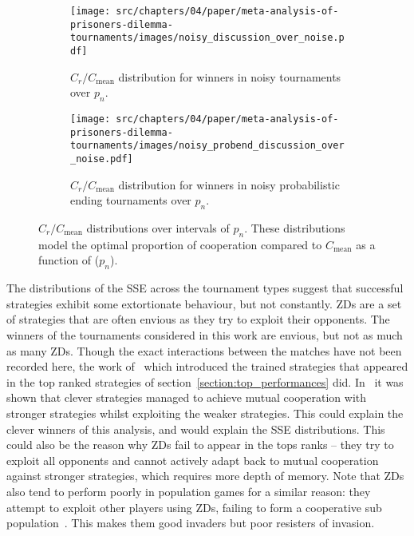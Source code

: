 \begin{figure}[!htbp]
    \centering
    \begin{subfigure}{0.485\textwidth}
        \centering
        \texttt{[image: src/chapters/04/paper/meta-analysis-of-prisoners-dilemma-tournaments/images/noisy\_discussion\_over\_noise.pdf]}
        \caption{\(C_r / C_{\text{mean}}\) distribution for winners in noisy tournaments over
        \(p_n\).}\label{fig:noisy_discussion_over_noise}
    \end{subfigure}
    \hfill
    \begin{subfigure}{0.485\textwidth}
        \centering
        \texttt{[image: src/chapters/04/paper/meta-analysis-of-prisoners-dilemma-tournaments/images/noisy\_probend\_discussion\_over\_noise.pdf]}
        \caption{\(C_r / C_{\text{mean}}\) distribution for winners in noisy probabilistic ending tournaments over
        \(p_n\).}\label{fig:noisy_probend_discussion_over_noise}
    \end{subfigure}
    \caption{\(C_r / C_{\text{mean}}\) distributions over intervals of \(p_n\).
    These distributions model the optimal proportion of cooperation
    compared to \(C_{\text{mean}}\) as a function of (\(p_n\)).}
    \label{fig:compared_to_mean_over_noise_probability}
\end{figure}

The distributions of the SSE across the tournament types suggest that successful
strategies exhibit some extortionate behaviour, but not constantly.
ZDs are a set of strategies that are often envious as they try to exploit their
opponents. The winners of the tournaments considered in this work are
envious, but not as much as many ZDs.
Though the exact interactions between the matches have not been recorded here,
the work of~\cite{Harper2017} which introduced the trained strategies that
appeared in the top ranked strategies of section~\ref{section:top_performances}
did. In~\cite{Harper2017} it was shown that clever strategies managed to achieve
mutual cooperation with stronger strategies whilst exploiting the weaker
strategies. This could explain the clever winners
of this analysis, and would explain the SSE distributions. This could also
be the reason why ZDs fail to appear in the tops ranks -- they try to exploit
all opponents and cannot actively adapt back to mutual cooperation against
stronger strategies, which requires more depth of memory. Note that
ZDs also tend to perform poorly in population games for a similar reason: they
attempt to exploit other players using ZDs, failing to form a cooperative
sub population~\cite{Knight2018}. This makes them good invaders but poor resisters of invasion.

